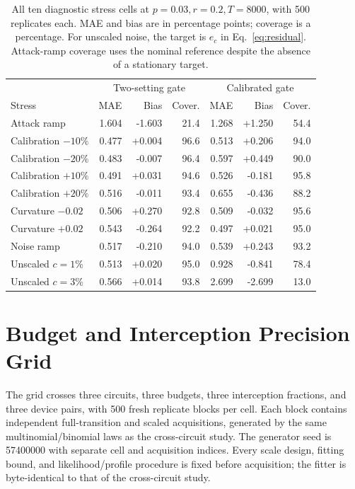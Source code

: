 \begin{table}[!htbp]
\centering
\small\setlength{\tabcolsep}{4pt}
\caption{All ten diagnostic stress cells at $p=0.03,r=0.2,T=8000$, with 500 replicates each. MAE and bias are in percentage points; coverage is a percentage. For unscaled noise, the target is $e_c$ in Eq.~\eqref{eq:residual}. Attack-ramp coverage uses the nominal reference despite the absence of a stationary target.}
\label{tab:stress}
\begin{tabular}{@{}lrrrrrr@{}}
\toprule
& \multicolumn{3}{c}{Two-setting gate} & \multicolumn{3}{c}{Calibrated gate} \\
Stress & MAE & Bias & Cover. & MAE & Bias & Cover. \\
\midrule
Attack ramp & 1.604 & -1.603 & 21.4 & 1.268 & +1.250 & 54.4 \\
Calibration $-10\%$ & 0.477 & +0.004 & 96.6 & 0.513 & +0.206 & 94.0 \\
Calibration $-20\%$ & 0.483 & -0.007 & 96.4 & 0.597 & +0.449 & 90.0 \\
Calibration $+10\%$ & 0.491 & +0.031 & 94.6 & 0.526 & -0.181 & 95.8 \\
Calibration $+20\%$ & 0.516 & -0.011 & 93.4 & 0.655 & -0.436 & 88.2 \\
Curvature $-0.02$ & 0.506 & +0.270 & 92.8 & 0.509 & -0.032 & 95.6 \\
Curvature $+0.02$ & 0.543 & -0.264 & 92.2 & 0.497 & +0.021 & 95.0 \\
Noise ramp & 0.517 & -0.210 & 94.0 & 0.539 & +0.243 & 93.2 \\
Unscaled $c=1\%$ & 0.513 & +0.020 & 95.0 & 0.928 & -0.841 & 78.4 \\
Unscaled $c=3\%$ & 0.566 & +0.014 & 93.8 & 2.699 & -2.699 & 13.0 \\
\bottomrule
\end{tabular}
\end{table}



\FloatBarrier
\section{Budget and Interception Precision Grid}
\label{app:precisiongrid}
The grid crosses three circuits, three budgets, three interception fractions,
and three device pairs, with 500 fresh replicate blocks per cell. Each block
contains independent full-transition and scaled acquisitions, generated by the
same multinomial/binomial laws as the cross-circuit study. The generator seed
is 57400000 with separate cell and acquisition indices. Every scale design,
fitting bound, and likelihood/profile procedure is fixed before acquisition;
the fitter is byte-identical to that of the cross-circuit study.

